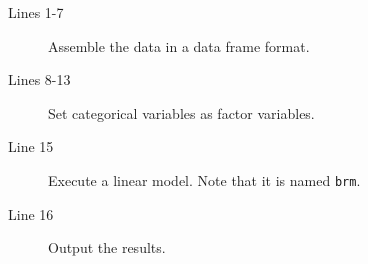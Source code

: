 \begin{description}
   \item[Lines 1-7] Assemble the data in a data frame format.
   \item[Lines 8-13] Set categorical variables as factor variables.
   \item[Line 15] Execute a linear model. Note that it is named \texttt{brm}.
   \item[Line 16] Output the results.
\end{description}
